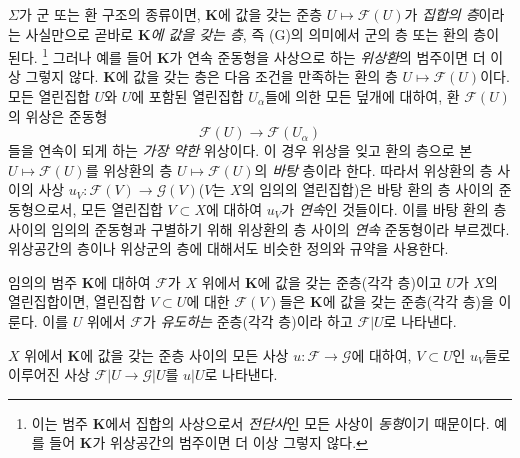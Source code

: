 \begin{env}[3.1.4]
\label{0.3.1.4-ko}
$\Sigma$가 군 또는 환 구조의 종류이면, $\mathbf K$에 값을 갖는 준층 $U\mapsto\mathcal F(U)$가 \emph{집합의 층}이라는 사실만으로 곧바로 \emph{$\mathbf K$에 값을 갖는 층}, 즉 (G)의 의미에서 군의 층 또는 환의 층이 된다.%
\footnote{이는 범주 $\mathbf K$에서 집합의 사상으로서 \emph{전단사}인 모든 사상이 \emph{동형}이기 때문이다. 예를 들어 $\mathbf K$가 위상공간의 범주이면 더 이상 그렇지 않다.}
그러나 예를 들어 $\mathbf K$가 연속 준동형을 사상으로 하는 \emph{위상환}의 범주이면 더 이상 그렇지 않다. $\mathbf K$에 값을 갖는 층은 다음 조건을 만족하는 환의 층 $U\mapsto\mathcal F(U)$이다. 모든 열린집합 $U$와 $U$에 포함된 열린집합 $U_\alpha$들에 의한 모든 덮개에 대하여, 환 $\mathcal F(U)$의 위상은 준동형
\[
  \mathcal F(U)\longrightarrow\mathcal F(U_\alpha)
\]
들을 연속이 되게 하는 \emph{가장 약한} 위상이다. 이 경우 위상을 잊고 환의 층으로 본 $U\mapsto\mathcal F(U)$를 위상환의 층 $U\mapsto\mathcal F(U)$의 \emph{바탕} 층이라 한다. 따라서 위상환의 층 사이의 사상 $u_V:\mathcal F(V)\to\mathcal G(V)$($V$는 $X$의 임의의 열린집합)은 바탕 환의 층 사이의 준동형으로서, 모든 열린집합 $V\subset X$에 대하여 $u_V$가 \emph{연속}인 것들이다. 이를 바탕 환의 층 사이의 임의의 준동형과 구별하기 위해 위상환의 층 사이의 \emph{연속} 준동형이라 부르겠다. 위상공간의 층이나 위상군의 층에 대해서도 비슷한 정의와 규약을 사용한다.
\end{env}


\begin{env}[3.1.5]
\label{0.3.1.5-ko}
임의의 범주 $\mathbf K$에 대하여 $\mathcal F$가 $X$ 위에서 $\mathbf K$에 값을 갖는 준층(각각 층)이고 $U$가 $X$의 열린집합이면, 열린집합 $V\subset U$에 대한 $\mathcal F(V)$들은 $\mathbf K$에 값을 갖는 준층(각각 층)을 이룬다. 이를 $U$ 위에서 $\mathcal F$가 \emph{유도하는} 준층(각각 층)이라 하고 $\mathcal F|U$로 나타낸다.

$X$ 위에서 $\mathbf K$에 값을 갖는 준층 사이의 모든 사상 $u:\mathcal F\to\mathcal G$에 대하여, $V\subset U$인 $u_V$들로 이루어진 사상 $\mathcal F|U\to\mathcal G|U$를 $u|U$로 나타낸다.
\end{env}

